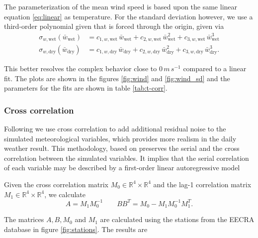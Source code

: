 \begin{refsection}
The parameterization of the mean wind speed is based upon the same linear equation \eqref{eq:linear} as temperature. For the standard deviation however, we use a third-order polynomial given that is forced through the origin, given via
\begin{align}
\sigma_{w, \mathrm{wet}}(\bar{w}_{\mathrm{wet}}) &= c_{1, w, \mathrm{wet}}\, \bar{w}_{\mathrm{wet}} + c_{2, w, \mathrm{wet}}\, \bar{w}_{\mathrm{wet}}^2 + c_{3, w, \mathrm{wet}}\, \bar{w}_{\mathrm{wet}}^3 \nonumber \\
\sigma_{w, \mathrm{dry}}(\bar{w}_{\mathrm{dry}}) &= c_{1, w, \mathrm{dry}}\, \bar{w}_{\mathrm{dry}} + c_{2, w, \mathrm{dry}}\, \bar{w}_{\mathrm{dry}}^2 + c_{3, w, \mathrm{dry}}\, \bar{w}_{\mathrm{dry}}^3 \label{eq:sd_wind}.
\end{align}

This better resolves the complex behavior close to $0\,\unit{m}\,\unit{s}^{-1}$ compared to a linear fit. The plots are shown in the figures \ref{fig:wind} and \ref{fig:wind_sd} and the parameters for the fits are shown in table \ref{tab:t-corr}.

\subsubsection{Cross correlation} \label{sec:corr}
Following \cite{Richardson1981} we use cross correlation to add additional residual noise to the simulated meteorological variables, which provides more realism in the daily weather result. This methodology, based on \cite{Matalas1967} preserves the serial and the cross correlation between the simulated variables. It implies that the serial correlation of each
variable may be described by a first-order linear autoregressive model

Given the cross correlation matrix $M_0\in\mathbb{R}^4\times\mathbb{R}^4$ and the lag-1 correlation matrix $M_1 \in\mathbb{R}^4\times\mathbb{R}^4$, we calculate 
\begin{equation}
A = M_1M_0^{-1} \qquad BB^T = M_0 - M_1M_0^{-1}M_1^T.
\end{equation}

The matrices $A, B, M_0$ and $M_1$ are calculated using the stations from the EECRA database in figure \ref{fig:stations}. The results are


\end{refsection}
